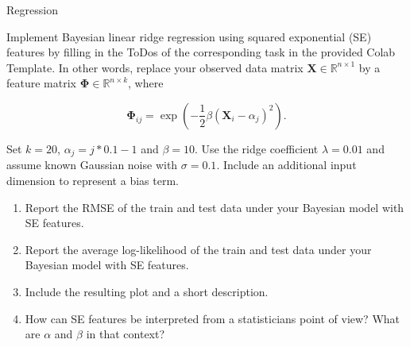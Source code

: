\documentclass[
	english,
        solution=true
	]{tudaexercise}
\begin{document}
\begin{task}[points=34]{Regression}
    \begin{subtask}[points=8, title=Squared Exponential Features]
        Implement Bayesian linear ridge regression using squared exponential (SE) features by filling in the ToDos of the corresponding task in the provided Colab Template.
        In other words, replace your observed data matrix $\mathbf{X} \in \mathbb{R}^{n \times 1}$ by a feature matrix $\bm{\Phi} \in \mathbb{R}^{n \times k}$, where

        \begin{equation*}
            \bm{\Phi}_{ij} = \exp \left( -\frac{1}{2} \beta (\mathbf{X}_i - \alpha_j)^2 \right).
        \end{equation*}

        Set $k = 20$, $\alpha_j = j * 0.1 - 1$ and $\beta = 10$. Use the ridge coefficient $\lambda = 0.01$ and assume known Gaussian noise with $\sigma = 0.1$.
        Include an additional input dimension to represent a bias term.

        \begin{enumerate}
            \item Report the RMSE of the train and test data under your Bayesian model with SE features. 
            \item Report the average log-likelihood of the train and test data under your Bayesian model with SE features. 
            \item Include the resulting plot and a short description. 
            \item How can SE features be interpreted from a statisticians point of view? What are $\alpha$ and $\beta$ in that context? 
        \end{enumerate}

        \begin{solution}

        \end{solution}
    \end{subtask}
\end{task}

\newpage
\end{document}
